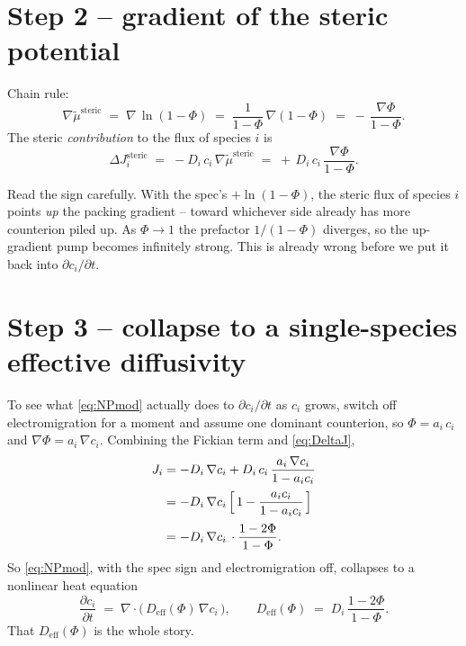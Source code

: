\documentclass[11pt]{article}
\newcommand{\Deff}{D_{\mathrm{eff}}}
\newcommand{\steric}{\mathrm{steric}}
\begin{document}
\section{Step 2 -- gradient of the steric potential}

Chain rule:
\begin{equation}
  \nabla \tilde\mu^{\steric}
   \;=\; \nabla\, \ln(1-\Phi)
   \;=\; \frac{1}{1-\Phi}\, \nabla(1-\Phi)
   \;=\; -\,\frac{\nabla\Phi}{1-\Phi}.
  \label{eq:gradmu}
\end{equation}
The steric \emph{contribution} to the flux of species $i$ is
\begin{equation}
  \Delta J_i^{\steric}
   \;=\; -D_i\, c_i\, \nabla\tilde\mu^{\steric}
   \;=\; +\, D_i\, c_i\, \frac{\nabla\Phi}{1-\Phi}.
  \label{eq:DeltaJ}
\end{equation}

Read the sign carefully. With the spec's $+\ln(1-\Phi)$, the steric flux
of species $i$ points \emph{up} the packing gradient -- toward whichever
side already has more counterion piled up. As $\Phi \to 1$ the prefactor
$1/(1-\Phi)$ diverges, so the up-gradient pump becomes infinitely
strong. This is already wrong before we put it back into
$\partial c_i/\partial t$.

\section{Step 3 -- collapse to a single-species effective diffusivity}

To see what \eqref{eq:NPmod} actually does to $\partial c_i/\partial t$
as $c_i$ grows, switch off electromigration for a moment and assume one
dominant counterion, so $\Phi = a_i\, c_i$ and $\nabla\Phi = a_i\, \nabla
c_i$. Combining the Fickian term and \eqref{eq:DeltaJ},
\begin{align}
  J_i &= -D_i\,\nabla c_i
        + D_i\, c_i\, \frac{a_i\, \nabla c_i}{1 - a_i c_i}
                                                       \nonumber \\[2pt]
      &= -D_i\,\nabla c_i\,
         \Bigl[\, 1 - \frac{a_i c_i}{1 - a_i c_i}\,\Bigr]
                                                       \nonumber \\[2pt]
      &= -D_i\,\nabla c_i\, \cdot \frac{1 - 2\Phi}{1 - \Phi}.
  \label{eq:Jspec}
\end{align}
So \eqref{eq:NPmod}, with the spec sign and electromigration off,
collapses to a nonlinear heat equation
\begin{equation}
\boxed{\;
  \frac{\partial c_i}{\partial t}
   \;=\; \nabla\!\cdot\!\bigl(\, \Deff(\Phi)\, \nabla c_i\,\bigr),
   \qquad
   \Deff(\Phi) \;=\; D_i\, \frac{1 - 2\Phi}{1 - \Phi}.
\;}
  \label{eq:DeffSpec}
\end{equation}
That $\Deff(\Phi)$ is the whole story.
\end{document}
